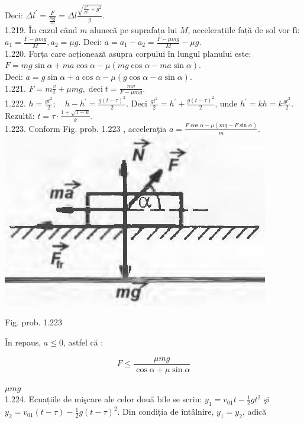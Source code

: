 \documentclass[10pt]{article}
\begin{document}
Deci: $\Delta l^{\prime}=\frac{F}{\frac{m g}{\Delta l}}=\Delta l \frac{\sqrt{\frac{v^{4}}{R^{2}}+g^{2}}}{g}$.\\
1.219. În cazul când $m$ alunecă pe suprafața lui $M$, accelerațiile față de sol vor fì: $a_{1}=\frac{F-\mu m g}{M}, a_{2}=\mu g$. Deci: $a=a_{1}-a_{2}=\frac{F-\mu m g}{M}-\mu g$.\\
1.220. Forța care acționează asupra corpului în lungul planului este:\\
$F=m g \sin \alpha+m a \cos \alpha-\mu(m g \cos \alpha-m a \sin \alpha)$.\\
Deci: $a=g \sin \alpha+a \cos \alpha-\mu(g \cos \alpha-a \sin \alpha)$.\\
1.221. $F=m \frac{v}{t}+\mu m g, \operatorname{deci} t=\frac{m v}{F-\mu m g}$.\\
1.222. $h=\frac{g t^{2}}{2} ; \quad h-h^{\prime}=\frac{g(t-\tau)^{2}}{2}$. Deci $\frac{g t^{2}}{2}=h^{\prime}+\frac{g(t-\tau)^{2}}{2}$, unde $h^{\prime}=k h=k \frac{g t^{2}}{2}$. Rezultă: $t=\tau \cdot \frac{1+\sqrt{1-k}}{k}$.\\
1.223. Conform Fig. prob. 1.223 , acceleraţia $a=\frac{F \cos \alpha-\mu(m g-F \sin \alpha)}{m}$.\\
\includegraphics[max width=\textwidth, center]{2025_07_01_5b3ff9fa0d508c8e9f17g-246}

Fig. prob. 1.223

În repaus, $a \leq 0$, astfel că :

$$
F \leq \frac{\mu m g}{\cos \alpha+\mu \sin \alpha}
$$

$\mu m g$\\
1.224. Ecuațiile de mişcare ale celor două bile se scriu: $y_{1}=v_{01} t-\frac{1}{2} g t^{2}$ şi $y_{2}=v_{01}(t-\tau)-\frac{1}{2} g(t-\tau)^{2}$. Din condiția de întâlnire, $y_{1}=y_{2}$, adică
\end{document}
